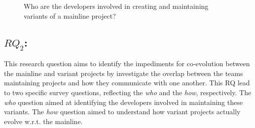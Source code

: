 \begin{figure}[ht]
\centering
\vspace{-.3cm}
    \hfill
    \hfill
    \hfill
    \caption{Who are the developers involved in creating and maintaining variants of a mainline project?}
     \label{fig:original_common}
     \vspace{-.3cm}
\end{figure}


\subsection*{\textbf{$RQ_2$: \RQTwo}}
This research question aims to identify the impediments for co-evolution between the mainline and variant projects by investigate the overlap between the teams maintaining projects and how they communicate with one another.
This RQ lead to two specific survey questions, reflecting the \textit{who} and the \textit{how}, respectively. The \textit{who} question aimed at identifying the developers involved in maintaining these variants. The \textit{how} question aimed to understand how  variant  projects actually evolve  w.r.t. the  mainline.

